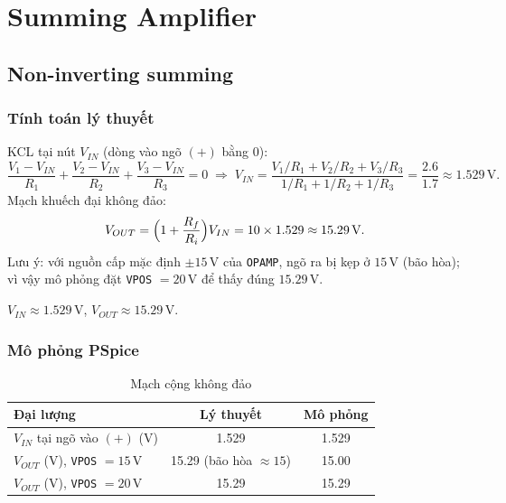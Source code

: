 \section{Summing Amplifier}\label{sec:summing}

\subsection{Non-inverting summing}\label{sec:summing-a}

\subsubsection*{Tính toán lý thuyết}
KCL tại nút $V_{IN}$ (dòng vào ngõ $(+)$ bằng $0$):
\[
\frac{V_1 - V_{IN}}{R_1} + \frac{V_2 - V_{IN}}{R_2} + \frac{V_3 - V_{IN}}{R_3} = 0
\;\Rightarrow\;
V_{IN} = \frac{V_1/R_1 + V_2/R_2 + V_3/R_3}{1/R_1 + 1/R_2 + 1/R_3}
= \frac{2.6}{1.7} \approx 1.529\,\text{V}.
\]
Mạch khuếch đại không đảo:
\[
V_{OUT} = \Bigl(1 + \frac{R_f}{R_i}\Bigr) V_{IN} = 10 \times 1.529 \approx 15.29\,\text{V}.
\]
Lưu ý: với nguồn cấp mặc định $\pm 15\,\text{V}$ của \texttt{OPAMP}, ngõ ra bị kẹp ở $15\,\text{V}$ (bão hòa); vì vậy mô phỏng đặt \texttt{VPOS} $=20\,\text{V}$ để thấy đúng $15.29\,\text{V}$.

\begin{dapsobox}
$V_{IN} \approx 1.529\,\text{V}$, \quad $V_{OUT} \approx 15.29\,\text{V}$.
\end{dapsobox}

\subsubsection*{Mô phỏng PSpice}
\simresult
{}
\begin{table}[H]
\centering
\begin{tabular}{l c c}
\toprule
\textbf{Đại lượng} & \textbf{Lý thuyết} & \textbf{Mô phỏng}\\
\midrule
$V_{IN}$ tại ngõ vào $(+)$ (V)                & 1.529 & 1.529\\
$V_{OUT}$ (V), \texttt{VPOS} $= 15\,\text{V}$ & 15.29 (bão hòa $\approx 15$) & 15.00\\
$V_{OUT}$ (V), \texttt{VPOS} $= 20\,\text{V}$ & 15.29 & 15.29\\
\bottomrule
\end{tabular}
\caption{Mạch cộng không đảo}
\end{table}

